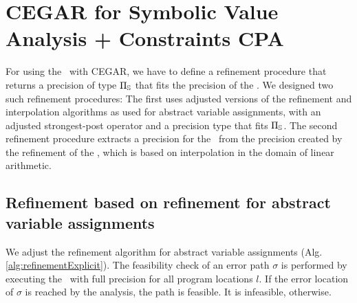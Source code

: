 \section{CEGAR for Symbolic Value Analysis + Constraints CPA}
For using the \symbolicExecutionCPA\ with CEGAR, we have to define a refinement procedure that returns a precision of type $\Pi_{\mathbb{S}}$ that fits the precision of the \symbolicExecutionCPA. We designed two such refinement procedures:
The first uses adjusted versions of the refinement and interpolation algorithms as used for abstract variable assignments,
with an adjusted strongest-post operator and a precision type that fits $\Pi_{\mathbb{S}}$.
The second refinement procedure extracts a precision for the \symbolicExecutionCPA\ from the precision created by the refinement of the \predicateCPA, which is based on interpolation in the domain of linear arithmetic.

\subsection{Refinement based on refinement for abstract variable assignments}
\label{sec:assignmentRefinement}
We adjust the refinement algorithm for abstract variable assignments (Alg. \ref{alg:refinementExplicit}).
The feasibility check of an error path $\sigma$ is performed by executing the \symbolicExecutionCPA\ with full precision for all program locations $l$.
If the error location of $\sigma$ is reached by the analysis, the path is feasible. It is infeasible, otherwise.

